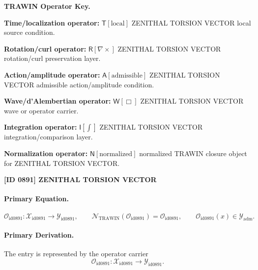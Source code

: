 \par\vspace{0.45\baselineskip}
\noindent\begin{minipage}[t]{\linewidth}
\begingroup
\small
\raggedright
\textbf{TRAWIN Operator Key.}\par
\noindent\textbf{Time/localization operator:} $\mathsf{T}\!\left[\mathrm{local}\right]$ ZENITHAL TORSION VECTOR local source condition.\par
\noindent\textbf{Rotation/curl operator:} $\mathsf{R}\!\left[\nabla\times\right]$ ZENITHAL TORSION VECTOR rotation/curl preservation layer.\par
\noindent\textbf{Action/amplitude operator:} $\mathsf{A}\!\left[\mathrm{admissible}\right]$ ZENITHAL TORSION VECTOR admissible action/amplitude condition.\par
\noindent\textbf{Wave/d'Alembertian operator:} $\mathsf{W}\!\left[\Box\right]$ ZENITHAL TORSION VECTOR wave or operator carrier.\par
\noindent\textbf{Integration operator:} $\mathsf{I}\!\left[\int\right]$ ZENITHAL TORSION VECTOR integration/comparison layer.\par
\noindent\textbf{Normalization operator:} $\mathsf{N}\!\left[\mathrm{normalized}\right]$ normalized TRAWIN closure object for ZENITHAL TORSION VECTOR.\par
\endgroup
\end{minipage}

\clearpage
\noindent\textbf{[ID 0891] ZENITHAL TORSION VECTOR}\par
\vspace{0.35em}
\paragraph{Primary Equation.}
\[
\mathcal{O}_{\mathrm{id0891}}:\mathcal{X}_{\mathrm{id0891}}\longrightarrow \mathcal{Y}_{\mathrm{id0891}},\qquad
\mathcal{N}_{\mathrm{TRAWIN}}(\mathcal{O}_{\mathrm{id0891}})=\mathcal{O}_{\mathrm{id0891}},\qquad
\mathcal{O}_{\mathrm{id0891}}(x)\in\mathcal{Y}_{\mathrm{adm}}.
\]

\paragraph{Primary Derivation.} The entry is represented by the operator carrier\[
\mathcal{O}_{\mathrm{id0891}}:\mathcal{X}_{\mathrm{id0891}}\longrightarrow \mathcal{Y}_{\mathrm{id0891}}.
\]

